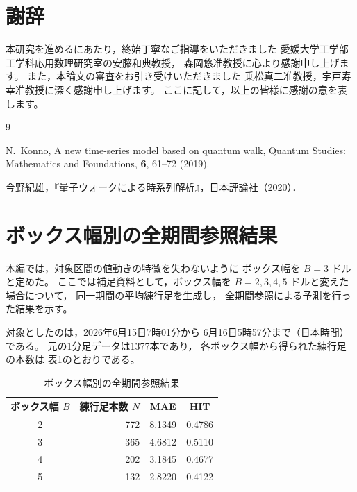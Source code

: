 \documentclass[a4j,dvipdfmx]{jsarticle}
\theoremstyle{plainnote}
\begin{document}
\newpage
\section*{謝辞}

本研究を進めるにあたり，終始丁寧なご指導をいただきました
愛媛大学工学部工学科応用数理研究室の安藤和典教授，
森岡悠准教授に心より感謝申し上げます。
また，本論文の審査をお引き受けいただきました
乗松真二准教授，宇戸寿幸准教授に深く感謝申し上げます。
ここに記して，以上の皆様に感謝の意を表します。

\newpage
\begin{thebibliography}{9}

  N.~Konno,
  A new time-series model based on quantum walk,
  Quantum Studies: Mathematics and Foundations, \textbf{6}, 61--72 (2019).

  今野紀雄，『量子ウォークによる時系列解析』，日本評論社（2020）．

\end{thebibliography}
\newpage
\appendix
\section{ボックス幅別の全期間参照結果}
\label{app:full_by_B}

本編では，対象区間の値動きの特徴を失わないように
ボックス幅を $B=3$ ドルと定めた。
ここでは補足資料として，ボックス幅を
$B=2,3,4,5$ ドルと変えた場合について，
同一期間の平均練行足を生成し，
全期間参照による予測を行った結果を示す。

対象としたのは，2026年6月15日7時01分から
6月16日5時57分まで（日本時間）である。
元の1分足データは1377本であり，
各ボックス幅から得られた練行足の本数は
表\ref{tab:app_full_summary}のとおりである。

\begin{table}[H]
  \centering
  \caption{ボックス幅別の全期間参照結果}
  \label{tab:app_full_summary}
  \begin{tabular}{c|r|c|c}
    \hline
    ボックス幅 $B$ & 練行足本数 $N$ & MAE & HIT \\
    \hline
    2 & 772 & 8.1349 & 0.4786 \\
    3 & 365 & 4.6812 & 0.5110 \\
    4 & 202 & 3.1845 & 0.4677 \\
    5 & 132 & 2.8220 & 0.4122 \\
    \hline
  \end{tabular}
\end{table}
\end{document}
